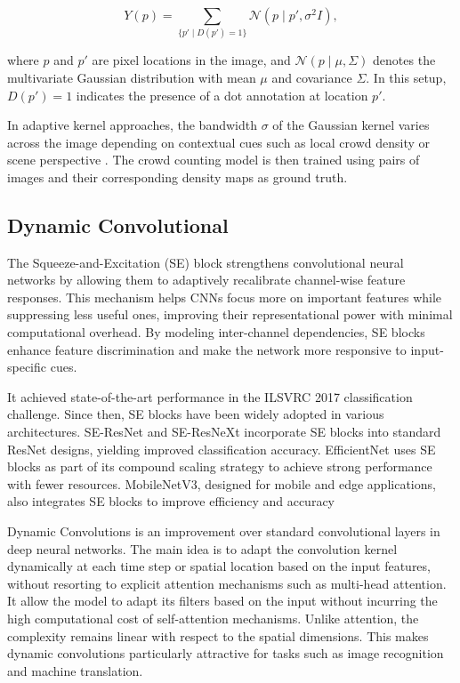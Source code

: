 \[
Y(p) = \sum_{\{p' \mid D(p') = 1\}} \mathcal{N}(p \mid p', \sigma^2 I),
\]

where $p$ and $p'$ are pixel locations in the image, and $\mathcal{N}(p \mid \mu, \Sigma)$ denotes the multivariate Gaussian distribution with mean $\mu$ and covariance $\Sigma$. In this setup, $D(p') = 1$ indicates the presence of a dot annotation at location $p'$.

In adaptive kernel approaches, the bandwidth $\sigma$ of the Gaussian kernel varies across the image depending on contextual cues such as local crowd density \cite{zhang2015cross} or scene perspective \cite{zhang2016single}. The crowd counting model is then trained using pairs of images and their corresponding density maps as ground truth.

\subsection{Dynamic Convolutional}

The Squeeze-and-Excitation (SE) block strengthens convolutional neural networks by allowing them to adaptively recalibrate channel-wise feature responses. This mechanism helps CNNs focus more on important features while suppressing less useful ones, improving their representational power with minimal computational overhead. By modeling inter-channel dependencies, SE blocks enhance feature discrimination and make the network more responsive to input-specific cues.

It achieved state-of-the-art performance in the ILSVRC 2017 classification challenge. Since then, SE blocks have been widely adopted in various architectures. SE-ResNet and SE-ResNeXt incorporate SE blocks into standard ResNet designs, yielding improved classification accuracy. EfficientNet uses SE blocks as part of its compound scaling strategy to achieve strong performance with fewer resources. MobileNetV3, designed for mobile and edge applications, also integrates SE blocks to improve efficiency and accuracy \cite{chen2020dynamic}

Dynamic Convolutions is an improvement over standard convolutional layers in deep neural networks. The main idea is to adapt the convolution kernel dynamically at each time step or spatial location based on the input features, without resorting to explicit attention mechanisms such as multi-head attention. It allow the model to adapt its filters based on the input without incurring the high computational cost of self-attention mechanisms. Unlike attention, the complexity remains linear with respect to the spatial dimensions. This makes dynamic convolutions particularly attractive for tasks such as image recognition and machine translation.

